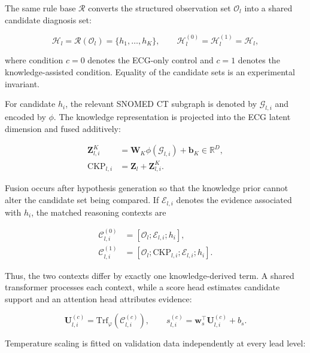 \documentclass{ssnreview}
\begin{document}
The same rule base $\mathcal{R}$ converts the structured observation set
$\mathcal{O}_l$ into a shared candidate diagnosis set:

\begin{equation}
  \mathcal{H}_l=\mathcal{R}(\mathcal{O}_l)
  =\{h_1,\ldots,h_K\},\qquad
  \mathcal{H}^{(0)}_l=\mathcal{H}^{(1)}_l=\mathcal{H}_l,
  \label{eq:hypotheses}
\end{equation}

where condition $c=0$ denotes the ECG-only control and $c=1$ denotes the
knowledge-assisted condition. Equality of the candidate sets is an experimental
invariant.

For candidate $h_i$, the relevant SNOMED CT subgraph is denoted by
$\mathcal{G}_{l,i}$ and encoded by $\phi$. The knowledge representation is projected
into the ECG latent dimension and fused additively:

\begin{align}
  \mathbf{Z}^{K}_{l,i}
  &=\mathbf{W}_K\phi(\mathcal{G}_{l,i})+\mathbf{b}_K
  \in\mathbb{R}^{D},
  \label{eq:knowledge-projection}\\
  \mathrm{CKP}_{l,i}
  &=\mathbf{Z}_l+\mathbf{Z}^{K}_{l,i}.
  \label{eq:ckp}
\end{align}

Fusion occurs after hypothesis generation so that the knowledge prior cannot alter the
candidate set being compared. If $\mathcal{E}_{l,i}$ denotes the evidence associated
with $h_i$, the matched reasoning contexts are

\begin{align}
  \mathcal{C}^{(0)}_{l,i}
  &=[\mathcal{O}_l;\mathcal{E}_{l,i};h_i],
  \label{eq:control-context}\\
  \mathcal{C}^{(1)}_{l,i}
  &=[\mathcal{O}_l;\mathrm{CKP}_{l,i};\mathcal{E}_{l,i};h_i].
  \label{eq:experimental-context}
\end{align}

Thus, the two contexts differ by exactly one knowledge-derived term. A shared transformer
processes each context, while a score head estimates candidate support and an attention
head attributes evidence:

\begin{equation}
  \mathbf{U}^{(c)}_{l,i}
  =\mathrm{Trf}_{\varphi}\!\left(\mathcal{C}^{(c)}_{l,i}\right),
  \qquad
  s^{(c)}_{l,i}
  =\mathbf{w}_s^{\top}\mathbf{U}^{(c)}_{l,i}+b_s.
  \label{eq:transformer-score}
\end{equation}

Temperature scaling is fitted on validation data independently at every lead level:
\end{document}
